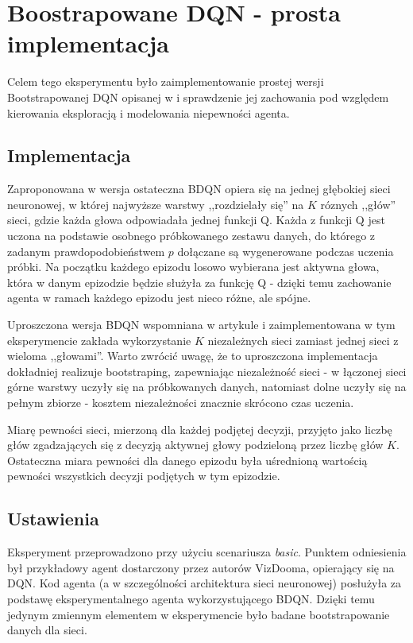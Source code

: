 \section{Boostrapowane DQN - prosta implementacja}
Celem tego eksperymentu było zaimplementowanie prostej wersji Bootstrapowanej DQN opisanej w \cite{DBLP:journals/corr/OsbandBPR16} i sprawdzenie jej zachowania pod względem kierowania eksploracją i modelowania niepewności agenta.

\subsection{Implementacja}
Zaproponowana w \cite{DBLP:journals/corr/OsbandBPR16} wersja ostateczna BDQN opiera się na jednej głębokiej sieci neuronowej, w której najwyższe warstwy ,,rozdzielały się'' na $K$ róznych ,,głów'' sieci, gdzie każda głowa odpowiadała jednej funkcji Q. Każda z funkcji Q jest uczona na podstawie osobnego próbkowanego zestawu danych, do którego z zadanym prawdopodobieństwem $p$ dołączane są wygenerowane podczas uczenia próbki. Na początku każdego epizodu losowo wybierana jest aktywna głowa, która w danym epizodzie będzie służyła za funkcję Q - dzięki temu zachowanie agenta w ramach każdego epizodu jest nieco różne, ale spójne.

Uproszczona wersja BDQN wspomniana w artykule i zaimplementowana w tym eksperymencie zakłada wykorzystanie $K$ niezależnych sieci zamiast jednej sieci z wieloma ,,głowami''. Warto zwrócić uwagę, że to uproszczona implementacja dokładniej realizuje bootstraping, zapewniając niezależność sieci - w łączonej sieci górne warstwy uczyły się na próbkowanych danych, natomiast dolne uczyły się na pełnym zbiorze - kosztem niezależności znacznie skrócono czas uczenia.

Miarę pewności sieci, mierzoną dla każdej podjętej decyzji, przyjęto jako liczbę głów zgadzających się z decyzją aktywnej głowy podzieloną przez liczbę głów $K$. Ostateczna miara pewności dla danego epizodu była uśrednioną wartością pewności wszystkich decyzji podjętych w tym epizodzie.

\subsection{Ustawienia}
Eksperyment przeprowadzono przy użyciu scenariusza \textit{basic}. Punktem odniesienia był przykładowy agent dostarczony przez autorów VizDooma, opierający się na DQN. Kod agenta (a w szczególności architektura sieci neuronowej) posłużyła za podstawę eksperymentalnego agenta wykorzystującego BDQN. Dzięki temu jedynym zmiennym elementem w eksperymencie było badane bootstrapowanie danych dla sieci.

